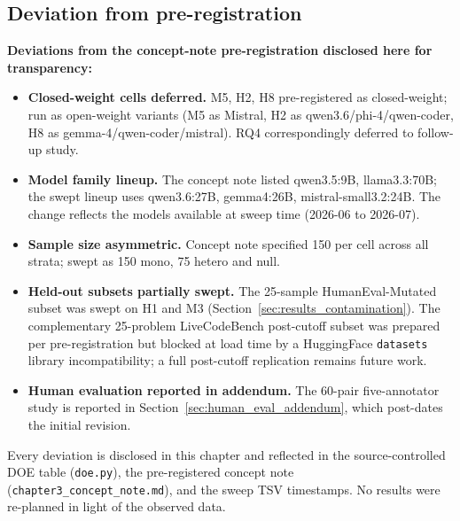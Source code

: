 \subsection{Deviation from pre-registration}

\textbf{Deviations from the concept-note pre-registration disclosed here for transparency:}

\begin{itemize}
  \item \textbf{Closed-weight cells deferred.} M5, H2, H8 pre-registered as closed-weight; run as open-weight variants (M5 as Mistral, H2 as qwen3.6/phi-4/qwen-coder, H8 as gemma-4/qwen-coder/mistral). RQ4 correspondingly deferred to follow-up study.
  \item \textbf{Model family lineup.} The concept note listed qwen3.5:9B, llama3.3:70B; the swept lineup uses qwen3.6:27B, gemma4:26B, mistral-small3.2:24B. The change reflects the models available at sweep time (2026-06 to 2026-07).
  \item \textbf{Sample size asymmetric.} Concept note specified 150 per cell across all strata; swept as 150 mono, 75 hetero and null.
  \item \textbf{Held-out subsets partially swept.} The 25-sample HumanEval-Mutated subset was swept on H1 and M3 (Section~\ref{sec:results_contamination}). The complementary 25-problem LiveCodeBench post-cutoff subset was prepared per pre-registration but blocked at load time by a HuggingFace \texttt{datasets} library incompatibility; a full post-cutoff replication remains future work.
  \item \textbf{Human evaluation reported in addendum.} The 60-pair five-annotator study is reported in Section~\ref{sec:human_eval_addendum}, which post-dates the initial revision.
\end{itemize}

Every deviation is disclosed in this chapter and reflected in the source-controlled DOE table (\texttt{doe.py}), the pre-registered concept note (\texttt{chapter3\_concept\_note.md}), and the sweep TSV timestamps. No results were re-planned in light of the observed data.
